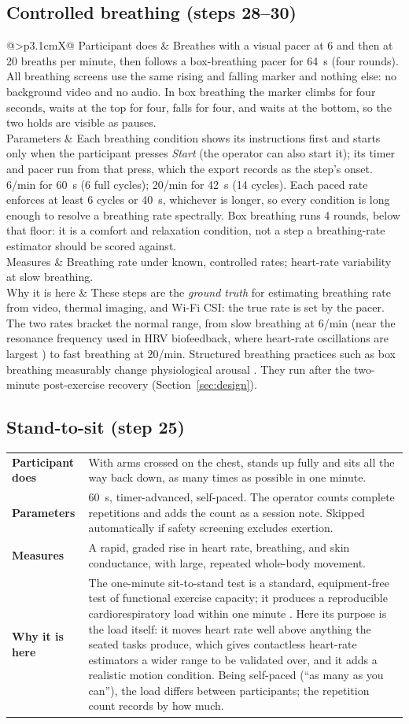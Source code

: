 \documentclass[11pt,a4paper]{article}
\makeatletter
\newcommand{\taskdetail}[4]{%
  \begin{tabularx}{\linewidth}{@{}>{\bfseries}p{3.1cm}X@{}}
    Participant does & #1 \\
    Parameters & #2 \\
    Measures & #3 \\
    Why it is here & #4 \\
  \end{tabularx}}
\makeatother
\begin{document}
\subsection{Controlled breathing (steps 28--30)}
\taskdetail
{Breathes with a visual pacer at 6 and then at 20 breaths per minute, then follows a box-breathing pacer
for 64~s (four rounds). All breathing screens use the same rising and falling marker and nothing else: no
background video and no audio. In box breathing the marker climbs for four seconds, waits at the top for four,
falls for four, and waits at the bottom, so the two holds are visible as pauses.}
{Each breathing condition shows its instructions first and starts only when the participant presses \emph{Start}
(the operator can also start it); its timer and pacer run from that press, which the export records as the step's
onset. 6/min for 60~s (6 full cycles); 20/min for 42~s (14 cycles). Each paced rate enforces at least 6 cycles or
40~s, whichever is longer, so every condition is long enough to resolve a breathing rate spectrally. Box breathing
runs 4 rounds, below that floor: it is a comfort and relaxation condition, not a step a breathing-rate estimator
should be scored against.}
{Breathing rate under known, controlled rates; heart-rate variability at slow breathing.}
{These steps are the \emph{ground truth} for estimating breathing rate from video, thermal imaging, and Wi-Fi CSI:
the true rate is set by the pacer. The two rates bracket the normal range, from slow breathing at 6/min (near the
resonance frequency used in HRV biofeedback, where heart-rate oscillations are largest \cite{lehrer2014}) to fast
breathing at 20/min. Structured breathing practices such as box breathing measurably change physiological arousal
\cite{balban2023}. They run after the two-minute post-exercise recovery (Section~\ref{sec:design}).}

\subsection{Stand-to-sit (step 25)}
\taskdetail
{With arms crossed on the chest, stands up fully and sits all the way back down, as many times as possible in one
minute.}
{60~s, timer-advanced, self-paced. The operator counts complete repetitions and adds the count as a session note.
Skipped automatically if safety screening excludes exertion.}
{A rapid, graded rise in heart rate, breathing, and skin conductance, with large, repeated whole-body movement.}
{The one-minute sit-to-stand test is a standard, equipment-free test of functional exercise capacity; it produces a
reproducible cardiorespiratory load within one minute \cite{bohannon2019}. Here its purpose is the load itself: it
moves heart rate well above anything the seated tasks produce, which gives contactless heart-rate estimators a
wider range to be validated over, and it adds a realistic motion condition. Being self-paced (``as many as you
can''), the load differs between participants; the repetition count records by how much.}
\end{document}

